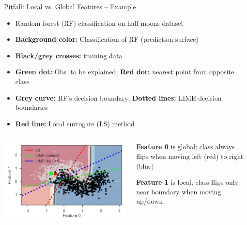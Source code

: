 \documentclass[11pt,compress,t,notes=noshow, aspectratio=169, xcolor=table]{beamer}
\begin{document}
\begin{frame}{Pitfall: Local vs. Global Features -- Example}
\begin{itemize}
		\item Random forest (RF) classification on half-moons dataset
		    \item \textbf{Background color:} Classification of RF (prediction surface)
		    \item \textbf{Black/grey crosses:} training data
            \item \textbf{Green dot:} Obs. to be explained; \textbf{Red dot:} nearest point from opposite class
		    \item \textbf{Grey curve:} RF's decision boundary; \textbf{Dotted lines:} LIME decision boundaries
             \item \textbf{Red line:} Local surrogate (LS) method 
	\end{itemize}

    
\begin{columns}[T, totalwidth=\textwidth]
  \begin{column}{0.63\textwidth}
	\includegraphics[width=\textwidth, trim = 5px 5px 0px 10px, clip]{figure/lime-globallocal2}
  \end{column}
  \pause
  \begin{column}{0.37\textwidth}
  \textbf{Feature 0} is global;
  class always flips when moving left (red) to right (blue)
  \medskip
  
  \textbf{Feature 1} is local;
  class flips only near boundary when moving up/down
\medskip


\end{column}
\end{columns}
\end{frame}
\end{document}
